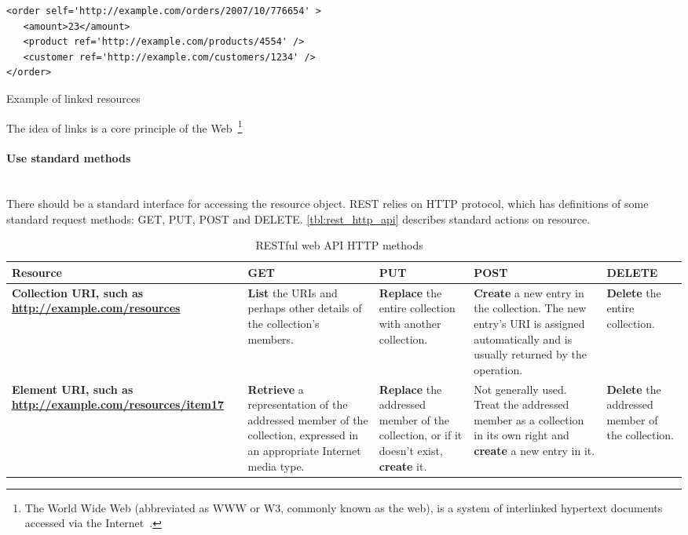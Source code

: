 \begin{listing}[H]
\begin{verbatim}
<order self='http://example.com/orders/2007/10/776654' > 
   <amount>23</amount> 
   <product ref='http://example.com/products/4554' /> 
   <customer ref='http://example.com/customers/1234' /> 
</order> 
\end{verbatim}
\caption{Example of linked resources~\cite{rest_brief_intro}}
\label{lst:linked_uri_example}
\end{listing}
 
The idea of links is a core principle of the Web~\footnote{The World Wide Web
(abbreviated as WWW or W3, commonly known as the web), is a system of
interlinked hypertext documents accessed via the Internet~\cite{wikipedia:WWW}.}

\paragraph{Use standard methods} ~\\

There should be a standard interface for accessing the resource object.
REST relies on HTTP protocol, which has definitions of some standard request
methods:
GET, PUT, POST and DELETE.
\autoref{tbl:rest_http_api} describes standard actions on resource.

\begin{table}[h]
	\centering	
	\caption{RESTful web API HTTP methods ~\cite{wikipedia:REST}}
	\label{tbl:rest_http_api}
	\begin{tabularx}{\textwidth}{|X|X|X|X|X|}
		\hline
		\textbf{Resource} & 
		\textbf{GET}  	& 
		\textbf{PUT} 	&
		\textbf{POST} &
		\textbf{DELETE}
	    
	    \tabularnewline
		\hline
			\begin{sloppypar}
				\textbf{Collection URI, such as \url{http://example.com/resources}}
			\end{sloppypar} &
			\textbf{List} the URIs and perhaps other details of the collection's members.&
			\textbf{Replace} the entire collection with another collection.&
			\textbf{Create} a new entry in the collection. The new entry's URI is
			assigned automatically and is usually returned by the operation. &
			\textbf{Delete} the entire collection.
			
	    	\tabularnewline	    	
	    	\hline
	    	\begin{sloppypar}
				\textbf{Element URI, such as \url{http://example.com/resources/item17}} 
			\end{sloppypar} &
			\textbf{Retrieve} a representation of the addressed member of the
			collection, expressed in an appropriate Internet media type. &
			\textbf{Replace} the addressed member of the collection, or if it
			doesn't exist, \textbf{create} it. &			
			Not generally used. Treat the addressed member as a collection in its own
			right and \textbf{create} a new entry in it. &			
			\textbf{Delete} the addressed member of the collection.
	
	    \tabularnewline
		\hline	  
	\end{tabularx} 
	
\end{table}

